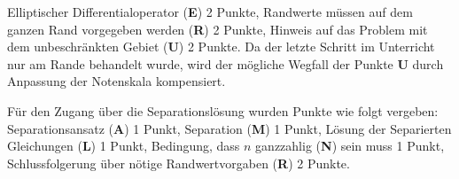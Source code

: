 \begin{bewertung}
Elliptischer Differentialoperator ({\bf E}) 2 Punkte,
Randwerte müssen auf dem ganzen Rand vorgegeben werden ({\bf R}) 2 Punkte,
Hinweis auf das Problem mit dem unbeschränkten Gebiet ({\bf U}) 2 Punkte.
Da der letzte Schritt im Unterricht nur am Rande behandelt wurde, wird der 
mögliche Wegfall der Punkte {\bf U} durch Anpassung der Notenskala
kompensiert.

Für den Zugang über die Separationslösung wurden Punkte wie folgt vergeben:
Separationsansatz ({\bf A}) 1 Punkt,
Separation ({\bf M}) 1 Punkt,
Lösung der Separierten Gleichungen ({\bf L}) 1 Punkt,
Bedingung, dass $n$ ganzzahlig ({\bf N}) sein muss 1 Punkt,
Schlussfolgerung über nötige Randwertvorgaben ({\bf R}) 2 Punkte.
\end{bewertung}

